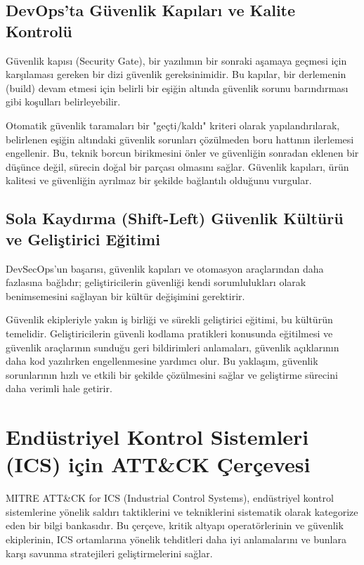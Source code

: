 \subsection{DevOps'ta Güvenlik Kapıları ve Kalite Kontrolü}

Güvenlik kapısı (Security Gate), bir yazılımın bir sonraki aşamaya geçmesi için karşılaması gereken bir dizi güvenlik gereksinimidir. Bu kapılar, bir derlemenin (build) devam etmesi için belirli bir eşiğin altında güvenlik sorunu barındırması gibi koşulları belirleyebilir.

Otomatik güvenlik taramaları bir "geçti/kaldı" kriteri olarak yapılandırılarak, belirlenen eşiğin altındaki güvenlik sorunları çözülmeden boru hattının ilerlemesi engellenir. Bu, teknik borcun birikmesini önler ve güvenliğin sonradan eklenen bir düşünce değil, sürecin doğal bir parçası olmasını sağlar. Güvenlik kapıları, ürün kalitesi ve güvenliğin ayrılmaz bir şekilde bağlantılı olduğunu vurgular.

\subsection{Sola Kaydırma (Shift-Left) Güvenlik Kültürü ve Geliştirici Eğitimi}

DevSecOps'un başarısı, güvenlik kapıları ve otomasyon araçlarından daha fazlasına bağlıdır; geliştiricilerin güvenliği kendi sorumlulukları olarak benimsemesini sağlayan bir kültür değişimini gerektirir.

Güvenlik ekipleriyle yakın iş birliği ve sürekli geliştirici eğitimi, bu kültürün temelidir. Geliştiricilerin güvenli kodlama pratikleri konusunda eğitilmesi ve güvenlik araçlarının sunduğu geri bildirimleri anlamaları, güvenlik açıklarının daha kod yazılırken engellenmesine yardımcı olur. Bu yaklaşım, güvenlik sorunlarının hızlı ve etkili bir şekilde çözülmesini sağlar ve geliştirme sürecini daha verimli hale getirir.

\section{Endüstriyel Kontrol Sistemleri (ICS) için ATT\&CK Çerçevesi}

MITRE ATT\&CK for ICS (Industrial Control Systems), endüstriyel kontrol sistemlerine yönelik saldırı taktiklerini ve tekniklerini sistematik olarak kategorize eden bir bilgi bankasıdır. Bu çerçeve, kritik altyapı operatörlerinin ve güvenlik ekiplerinin, ICS ortamlarına yönelik tehditleri daha iyi anlamalarını ve bunlara karşı savunma stratejileri geliştirmelerini sağlar.


